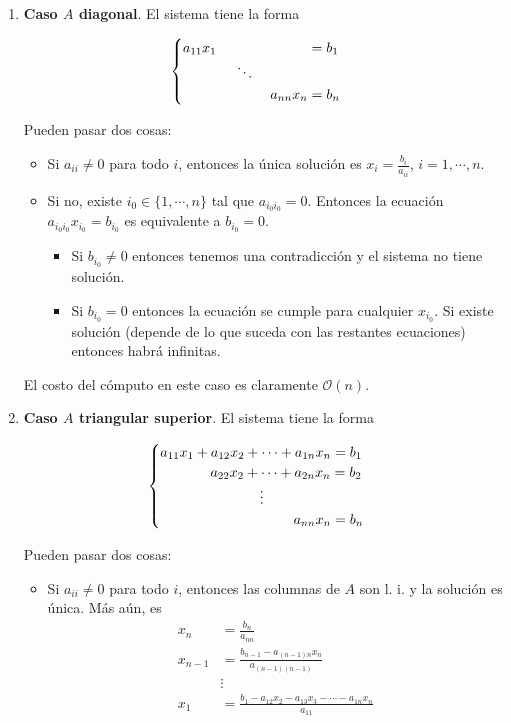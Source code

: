 \begin{enumerate}
\item \textbf{Caso $A$ diagonal}. El sistema tiene la forma

\[\begin{cases}
a_{11} x_1 \hspace{2.3cm} = b_1 \\
\hspace{1.35cm}\ddots \\
\hspace{2.2cm} a_{nn} x_n = b_n
\end{cases}\]

Pueden pasar dos cosas:

\begin{itemize}
\item Si $a_{ii} \neq 0$ para todo $i$, entonces la única solución es $x_i = \frac{b_i}{a_{ii}}$, $i = 1, \cdots, n$.
\item Si no, existe $i_0 \in \{1, \cdots, n\}$ tal que $a_{i_0i_0} = 0$. Entonces la ecuación $a_{i_0i_0} x_{i_0} = b_{i_0}$ es equivalente a $b_{i_0} = 0$.
\begin{itemize}
\item Si $b_{i_0} \neq 0$ entonces tenemos una contradicción y el sistema no tiene solución.
\item Si $b_{i_0} = 0$ entonces la ecuación se cumple para cualquier $x_{i_0}$. Si existe solución (depende de lo que suceda con las restantes ecuaciones) entonces habrá infinitas.
\end{itemize}
\end{itemize}

El costo del cómputo en este caso es claramente $\mathcal{O}(n)$.

\item \textbf{Caso $A$ triangular superior}. El sistema tiene la forma

\[\begin{cases}
a_{11} x_1 + a_{12} x_2 + \cdots + a_{1n} x_n = b_1 \\
\hspace{1.26cm} a_{22} x_2 + \cdots + a_{2n} x_n = b_2 \\
\hspace{2.5cm}\vdots \\
\hspace{3.35cm} a_{nn} x_n = b_n
\end{cases}\]

Pueden pasar dos cosas:

\begin{itemize}
\item Si $a_{ii} \neq 0$ para todo $i$, entonces las columnas de $A$ son l. i. y la solución es única. Más aún, es
\begin{align}
x_n &= \frac{b_n}{a_{nn}}	\nonumber\\
x_{n - 1} &= \frac{b_{n - 1} - a_{(n-1)n} x_n}{a_{(n-1)(n-1)}}	\nonumber\\
&\vdots \nonumber\\
x_1 &= \frac{b_1 - a_{12}x_2 - a_{13}x_3 - \cdots - a_{1n} x_n}{a_{11}}	\nonumber
\end{align}


\end{itemize}
\end{enumerate}
